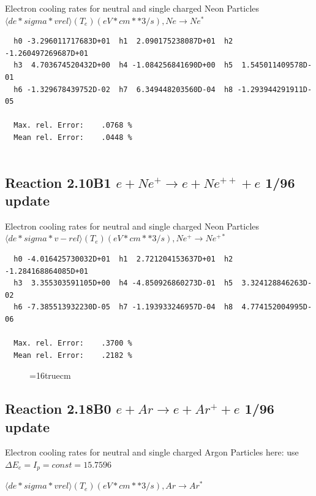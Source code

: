 \documentclass[12pt,dvips]{article}
\begin{document}
  Electron cooling rates for neutral and single
  charged Neon Particles
 $ \langle de*sigma*vrel \rangle(T_e)  (eV*cm**3/s), Ne  \rightarrow  Ne^*$

\begin{small}\begin{verbatim}
  h0 -3.296011717683D+01  h1  2.090175238087D+01  h2 -1.260497269687D+01
  h3  4.703674520432D+00  h4 -1.084256841690D+00  h5  1.545011409578D-01
  h6 -1.329678439752D-02  h7  6.349448203560D-04  h8 -1.293944291911D-05

  Max. rel. Error:    .0768 %
  Mean rel. Error:    .0448 %


\end{verbatim}\end{small}


\subsection{
Reaction 2.10B1 $ e + Ne^+ \rightarrow e + Ne^{++} + e $ 1/96 update
}

  Electron cooling rates for neutral and single
  charged Neon Particles
 $  \langle de*sigma*v-rel \rangle(T_e)  (eV*cm**3/s), Ne^+ \rightarrow Ne^{+*} $

\begin{small}\begin{verbatim}
  h0 -4.016425730032D+01  h1  2.721204153637D+01  h2 -1.284168864085D+01
  h3  3.355303591105D+00  h4 -4.850926860273D-01  h5  3.324128846263D-02
  h6 -7.385513932230D-05  h7 -1.193933246957D-04  h8  4.774152004995D-06

  Max. rel. Error:    .3700 %
  Mean rel. Error:    .2182 %

\end{verbatim}\end{small}

\begin{figure} \label{2.10l}
\epsfxsize=16truecm
\end{figure}
\newpage

\subsection{
Reaction 2.18B0 $e + Ar  \rightarrow e + Ar^+  + e$ 1/96 update
}

  Electron cooling rates for neutral and single
  charged Argon Particles
  here: use $\Delta E_e = I_p = const = 15.7596$

 $ \langle de*sigma*vrel \rangle(T_e)  (eV*cm**3/s), Ar  \rightarrow Ar^* $
\end{document}
